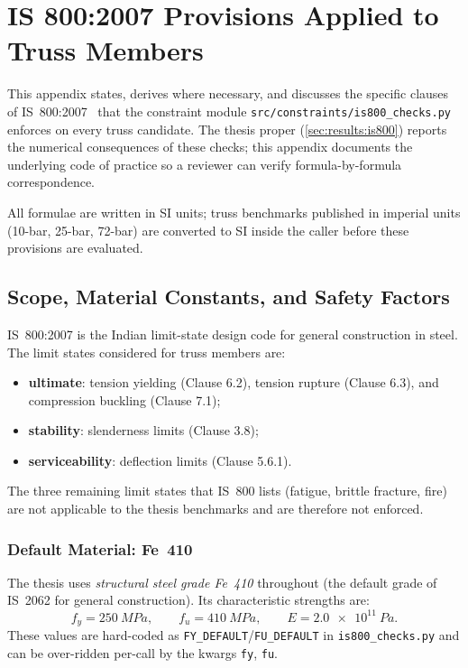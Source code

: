 \chapter{IS 800:2007 Provisions Applied to Truss Members}
\label{app:is800}

This appendix states, derives where necessary, and discusses the
specific clauses of IS~800:2007~\cite{is800-2007} that the
constraint module \texttt{src/constraints/is800\_checks.py}
enforces on every truss candidate. The thesis proper
(\cref{sec:results:is800}) reports the numerical consequences of
these checks; this appendix documents the underlying code of practice
so a reviewer can verify formula-by-formula correspondence.

All formulae are written in SI units; truss benchmarks published
in imperial units (10-bar, 25-bar, 72-bar) are converted to SI
inside the caller before these provisions are evaluated.

\section{Scope, Material Constants, and Safety Factors}
\label{app:is800:scope}

IS~800:2007 is the Indian limit-state design code for general
construction in steel. The limit states considered for truss
members are:
\begin{itemize}
  \item \textbf{ultimate}: tension yielding (Clause 6.2), tension
        rupture (Clause 6.3), and compression buckling
        (Clause 7.1);
  \item \textbf{stability}: slenderness limits (Clause 3.8);
  \item \textbf{serviceability}: deflection limits
        (Clause 5.6.1).
\end{itemize}
The three remaining limit states that IS~800 lists
(fatigue, brittle fracture, fire) are not applicable to the
thesis benchmarks and are therefore not enforced.

\subsection{Default Material: Fe~410}
\label{app:is800:fe410}

The thesis uses \emph{structural steel grade Fe~410} throughout
(the default grade of IS~2062 for general construction). Its
characteristic strengths are:
\begin{equation}
  f_y = \SI{250}{MPa},
  \qquad
  f_u = \SI{410}{MPa},
  \qquad
  E = \SI{2.0e11}{Pa}.
\end{equation}
These values are hard-coded as \texttt{FY\_DEFAULT}/\texttt{FU\_DEFAULT}
in \texttt{is800\_checks.py} and can be over-ridden per-call by
the kwargs \texttt{fy}, \texttt{fu}.

